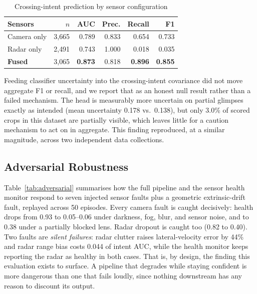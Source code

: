 \documentclass[conference]{IEEEtran}
\begin{document}
\begin{table}[htbp]
\caption{Crossing-intent prediction by sensor configuration}
\label{tab:intent}
\centering
\begin{tabular}{@{}lrrrrr@{}}
\toprule
Sensors & $n$ & AUC & Prec. & Recall & F1 \\
\midrule
Camera only & 3{,}665 & 0.789 & 0.833 & 0.654 & 0.733 \\
Radar only & 2{,}491 & 0.743 & 1.000 & 0.018 & 0.035 \\
\textbf{Fused} & 3{,}065 & \textbf{0.873} & 0.818 & \textbf{0.896} & \textbf{0.855} \\
\bottomrule
\end{tabular}
\end{table}

Feeding classifier uncertainty into the crossing-intent covariance did
not move aggregate F1 or recall, and we report that as an honest null
result rather than a failed mechanism. The head is measurably more
uncertain on partial glimpses exactly as intended (mean uncertainty
0.178 vs.\ 0.138), but only 3.0\% of scored crops in this dataset are
partially visible, which leaves little for a caution mechanism to act
on in aggregate. This finding reproduced, at a similar magnitude,
across two independent data collections.

\subsection{Adversarial Robustness}

Table~\ref{tab:adversarial} summarises how the full pipeline and the
sensor health monitor respond to seven injected sensor faults plus a
geometric extrinsic-drift fault, replayed across 50 episodes. Every
camera fault is caught decisively: health drops from 0.93 to
0.05--0.06 under darkness, fog, blur, and sensor noise, and to 0.38
under a partially blocked lens. Radar dropout is caught too (0.82 to
0.40). Two faults are \emph{silent failures}: radar clutter raises
lateral-velocity error by 44\% and radar range bias costs 0.044 of
intent AUC, while the health monitor keeps reporting the radar as
healthy in both cases. That is, by design, the finding this evaluation
exists to surface. A pipeline that degrades while staying confident is
more dangerous than one that fails loudly, since nothing downstream has
any reason to discount its output.
\end{document}
